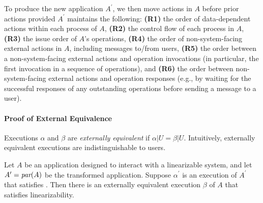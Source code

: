 
To produce the new application $A^\prime$, we then move actions in $A$ before prior 
actions provided $A^\prime$ maintains the following:
\textbf{(R1)} the order of data-dependent actions within
each process of $A$,
\textbf{(R2)} the control flow of each process in $A$,
\textbf{(R3)} the issue order of $A$'s operations,
\textbf{(R4)} the order of non-system-facing external
actions in $A$, including messages to/from users,
\textbf{(R5)} the order between a non-system-facing external 
actions and operation invocations (in particular, the first invocation in a
sequence of operations), and
\textbf{(R6)} the order between non-system-facing external actions and operation responses (e.g., by waiting for the successful responses of any outstanding operations before sending a message to a user).

\paragraph{Proof of External Equivalence}

Executions $\alpha$ and $\beta$ are
\textit{externally equivalent} if $\alpha|U = \beta|U$. Intuitively,
externally equivalent executions are indistinguishable to users.

\begin{thm}
Let $A$ be an application designed to interact with a linearizable system,
and let $A^\prime = \operatorname*{\textit{par}}(A)$ be the transformed application. Suppose
$\alpha^\prime$ is an execution of $A^\prime$ that satisfies
\MDL{}. Then there is an externally equivalent execution $\beta$
of $A$ that satisfies linearizability.
\end{thm}


